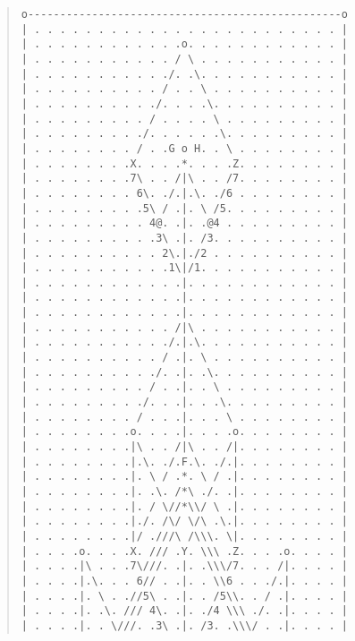 \documentclass[12pt]{article}
\begin{document}
\begin{quote}\begin{verbatim}
o-------------------------------------------------o
| . . . . . . . . . . . . . . . . . . . . . . . . |
| . . . . . . . . . . . .o. . . . . . . . . . . . |
| . . . . . . . . . . . / \ . . . . . . . . . . . |
| . . . . . . . . . . ./. .\. . . . . . . . . . . |
| . . . . . . . . . . / . . \ . . . . . . . . . . |
| . . . . . . . . . ./. . . .\. . . . . . . . . . |
| . . . . . . . . . / . . . . \ . . . . . . . . . |
| . . . . . . . . ./. . . . . .\. . . . . . . . . |
| . . . . . . . . / . .G o H. . \ . . . . . . . . |
| . . . . . . . .X. . . .*. . . .Z. . . . . . . . |
| . . . . . . . .7\ . . /|\ . . /7. . . . . . . . |
| . . . . . . . . 6\. ./.|.\. ./6 . . . . . . . . |
| . . . . . . . . .5\ / .|. \ /5. . . . . . . . . |
| . . . . . . . . . 4@. .|. .@4 . . . . . . . . . |
| . . . . . . . . . .3\ .|. /3. . . . . . . . . . |
| . . . . . . . . . . 2\.|./2 . . . . . . . . . . |
| . . . . . . . . . . .1\|/1. . . . . . . . . . . |
| . . . . . . . . . . . .|. . . . . . . . . . . . |
| . . . . . . . . . . . .|. . . . . . . . . . . . |
| . . . . . . . . . . . .|. . . . . . . . . . . . |
| . . . . . . . . . . . /|\ . . . . . . . . . . . |
| . . . . . . . . . . ./.|.\. . . . . . . . . . . |
| . . . . . . . . . . / .|. \ . . . . . . . . . . |
| . . . . . . . . . ./. .|. .\. . . . . . . . . . |
| . . . . . . . . . / . .|. . \ . . . . . . . . . |
| . . . . . . . . ./. . .|. . .\. . . . . . . . . |
| . . . . . . . . / . . .|. . . \ . . . . . . . . |
| . . . . . . . .o. . . .|. . . .o. . . . . . . . |
| . . . . . . . .|\ . . /|\ . . /|. . . . . . . . |
| . . . . . . . .|.\. ./.F.\. ./.|. . . . . . . . |
| . . . . . . . .|. \ / .*. \ / .|. . . . . . . . |
| . . . . . . . .|. .\. /*\ ./. .|. . . . . . . . |
| . . . . . . . .|. / \//*\\/ \ .|. . . . . . . . |
| . . . . . . . .|./. /\/ \/\ .\.|. . . . . . . . |
| . . . . . . . .|/ .///\ /\\\. \|. . . . . . . . |
| . . . .o. . . .X. /// .Y. \\\ .Z. . . .o. . . . |
| . . . .|\ . . .7\///. .|. .\\\/7. . . /|. . . . |
| . . . .|.\. . . 6// . .|. . \\6 . . ./.|. . . . |
| . . . .|. \ . .//5\ . .|. . /5\\. . / .|. . . . |
| . . . .|. .\. /// 4\. .|. ./4 \\\ ./. .|. . . . |
| . . . .|. . \///. .3\ .|. /3. .\\\/ . .|. . . . |

\end{verbatim}
\end{quote}
\end{document}
